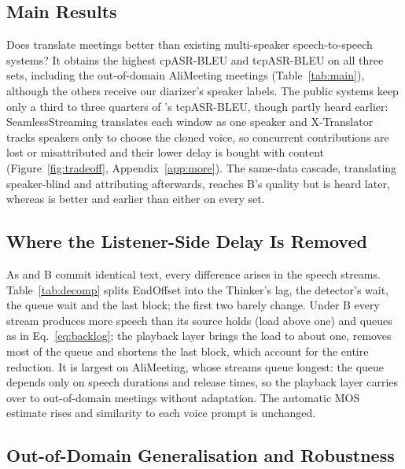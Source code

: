 

\subsection{Main Results}
\label{sec:res-sys}

Does \sys{} translate meetings better than existing multi-speaker speech-to-speech systems? It obtains the highest
cpASR-BLEU and tcpASR-BLEU on all three sets, including the out-of-domain AliMeeting meetings (Table~\ref{tab:main}),
although the others receive our diarizer's speaker labels. The public
systems keep only a third to three quarters of \sys{}'s tcpASR-BLEU, though partly heard earlier: SeamlessStreaming translates each window as one speaker and
X-Translator tracks speakers only to choose the cloned voice, so concurrent contributions are lost or misattributed and
their lower delay is bought with content (Figure~\ref{fig:tradeoff}, Appendix~\ref{app:more}). The same-data cascade,
translating speaker-blind and attributing afterwards, reaches B's quality but is heard later, whereas \sys{} is better
and earlier than either on every set.



\subsection{Where the Listener-Side Delay Is Removed}
\label{sec:res-delay}

As \sys{} and B commit identical text, every difference arises in the speech streams. Table~\ref{tab:decomp} splits
EndOffset into the Thinker's lag, the detector's wait, the queue wait and the last block; the first two barely change.
Under B every stream produces more speech than its source holds (load above one) and queues as in
Eq.~\eqref{eq:backlog}; the playback layer brings the load to about one, removes most of the queue and shortens the
last block, which account for the entire reduction. It is largest on AliMeeting, whose streams queue longest: the queue
depends only on speech durations and release times, so the playback layer carries over to out-of-domain meetings
without adaptation. The automatic MOS estimate rises and similarity to each voice prompt is unchanged.



\subsection{Out-of-Domain Generalisation and Robustness}
\label{sec:res-robust}

